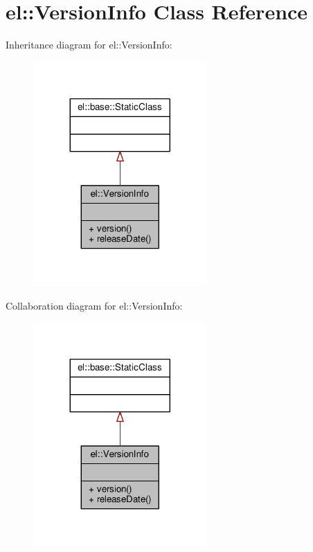 \hypertarget{classel_1_1VersionInfo}{}\section{el\+:\+:Version\+Info Class Reference}
\label{classel_1_1VersionInfo}


Inheritance diagram for el\+:\+:Version\+Info\+:
\nopagebreak
\begin{figure}[H]
\begin{center}
\leavevmode
\includegraphics[width=188pt]{d4/d4b/classel_1_1VersionInfo__inherit__graph}
\end{center}
\end{figure}


Collaboration diagram for el\+:\+:Version\+Info\+:
\nopagebreak
\begin{figure}[H]
\begin{center}
\leavevmode
\includegraphics[width=188pt]{d0/de5/classel_1_1VersionInfo__coll__graph}
\end{center}
\end{figure}
